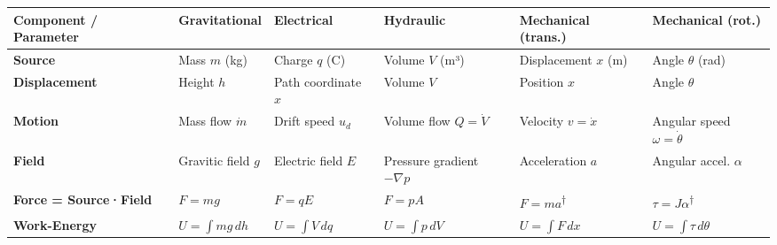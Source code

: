 \documentclass[
  letterpaper,
  DIV=11,
  numbers=noendperiod]{scrartcl}
\begin{document}
\begin{longtable}[]{@{}
  >{\raggedright\arraybackslash}p{}
  >{\raggedright\arraybackslash}p{}
  >{\raggedright\arraybackslash}p{}
  >{\raggedright\arraybackslash}p{}
  >{\raggedright\arraybackslash}p{}
  >{\raggedright\arraybackslash}p{}@{}}
\toprule\noalign{}
\begin{minipage}[b]{\linewidth}\raggedright
Component / Parameter
\end{minipage} & \begin{minipage}[b]{\linewidth}\raggedright
Gravitational
\end{minipage} & \begin{minipage}[b]{\linewidth}\raggedright
Electrical
\end{minipage} & \begin{minipage}[b]{\linewidth}\raggedright
Hydraulic
\end{minipage} & \begin{minipage}[b]{\linewidth}\raggedright
Mechanical (trans.)
\end{minipage} & \begin{minipage}[b]{\linewidth}\raggedright
Mechanical (rot.)
\end{minipage} \\
\midrule\noalign{}
\endhead
\bottomrule\noalign{}
\endlastfoot
\textbf{Source} & Mass \(m\) (kg) & Charge \(q\) (C) & Volume \(V\) (m³)
& Displacement \(x\) (m) & Angle \(\theta\) (rad) \\
\textbf{Displacement} & Height \(h\) & Path coordinate \(x\) & Volume
\(V\) & Position \(x\) & Angle \(\theta\) \\
\textbf{Motion} & Mass flow \(\dot{m}\) & Drift speed \(u_d\) & Volume
flow \(Q=\dot{V}\) & Velocity \(v=\dot{x}\) & Angular speed
\(\omega=\dot{\theta}\) \\
\textbf{Field} & Gravitic field \(g\) & Electric field \(E\) & Pressure
gradient \(-\nabla p\) & Acceleration \(a\) & Angular accel.
\(\alpha\) \\
\textbf{Force = Source·Field} & \(F=mg\) & \(F=qE\) & \(F=pA\) &
\(F=ma\)\textsuperscript{†} & \(\tau=J\alpha\)\textsuperscript{†} \\
\textbf{Work-Energy} & \(U=\int mg\,dh\) & \(U=\int V\,dq\) &
\(U=\int p\,dV\) & \(U=\int F\,dx\) & \(U=\int \tau\,d\theta\) \\

\end{longtable}
\end{document}
